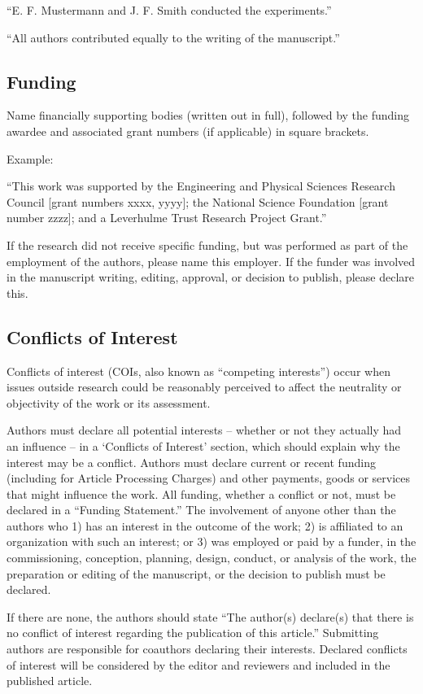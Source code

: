 \documentclass{article}
\begin{document}
``E. F. Mustermann and J. F. Smith conducted the experiments.''

``All authors contributed equally to the writing of the manuscript.''

\subsection*{Funding}
Name financially supporting bodies (written out in full), followed by the funding awardee and associated grant numbers (if applicable) in square brackets. 

\medskip Example: 

``This work was supported by the Engineering and Physical Sciences Research Council [grant numbers xxxx, yyyy]; the National Science Foundation [grant number zzzz]; and a Leverhulme Trust Research Project Grant.'' 

\medskip
If the research did not receive specific funding, but was performed as part of the employment of the authors, please name this employer. If the funder was involved in the manuscript writing, editing, approval, or decision to publish, please declare this.

\subsection*{Conflicts of Interest}
Conflicts of interest (COIs, also known as ``competing interests'') occur when issues outside research could be reasonably perceived to affect the neutrality or objectivity of the work or its assessment. 

Authors must declare all potential interests – whether or not they actually had an influence – in a ‘Conflicts of Interest’ section, which should explain why the interest may be a conflict. Authors must declare current or recent funding (including for Article Processing Charges) and other payments, goods or services that might influence the work. All funding, whether a conflict or not, must be declared in a ``Funding Statement.'' The involvement of anyone other than the authors who 1) has an interest in the outcome of the work; 2) is affiliated to an organization with such an interest; or 3) was employed or paid by a funder, in the commissioning, conception, planning, design, conduct, or analysis of the work, the preparation or editing of the manuscript, or the decision to publish must be declared.

If there are none, the authors should state ``The author(s) declare(s) that there is no conflict of interest regarding the publication of this article.'' Submitting authors are responsible for coauthors declaring their interests. Declared conflicts of interest will be considered by the editor and reviewers and included in the published article.
\end{document}
